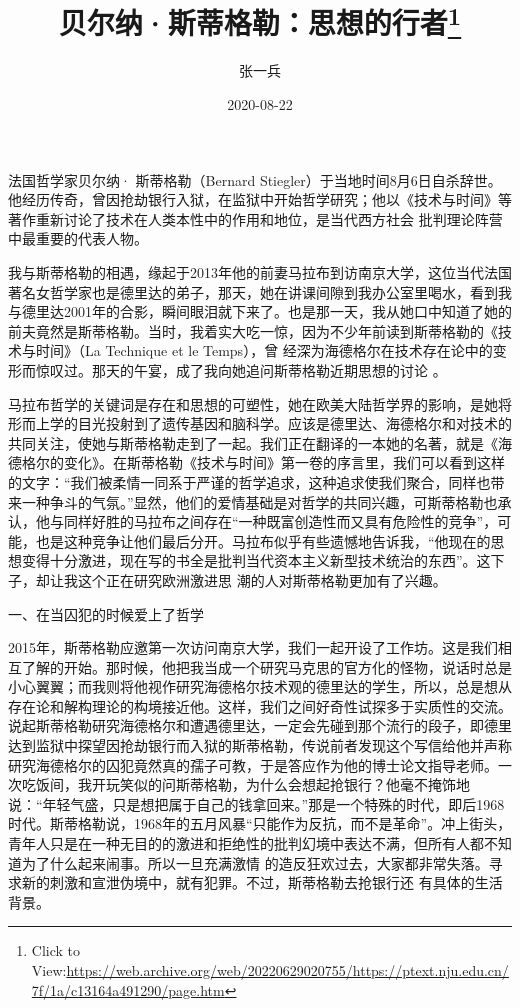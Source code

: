 \documentclass{article}
\title{贝尔纳·斯蒂格勒：思想的行者\footnote{Click to View:\url{https://web.archive.org/web/20220629020755/https://ptext.nju.edu.cn/7f/1a/c13164a491290/page.htm}}}
\author{张一兵}
\date{2020-08-22}
\begin{document}

\maketitle


\Large

﻿法国哲学家贝尔纳· 斯蒂格勒（Bernard Stiegler）于当地时间8月6日自杀辞世。他经历传奇，曾因抢劫银行入狱，在监狱中开始哲学研究；他以《技术与时间》等著作重新讨论了技术在人类本性中的作用和地位，是当代西方社会
批判理论阵营中最重要的代表人物。 

我与斯蒂格勒的相遇，缘起于2013年他的前妻马拉布到访南京大学，这位当代法国著名女哲学家也是德里达的弟子，那天，她在讲课间隙到我办公室里喝水，看到我与德里达2001年的合影，瞬间眼泪就下来了。也是那一天，我从她口中知道了她的前夫竟然是斯蒂格勒。当时，我着实大吃一惊，因为不少年前读到斯蒂格勒的《技术与时间》（La Technique et le Temps），曾
\newpage
经深为海德格尔在技术存在论中的变形而惊叹过。那天的午宴，成了我向她追问斯蒂格勒近期思想的讨论
。 

马拉布哲学的关键词是存在和思想的可塑性，她在欧美大陆哲学界的影响，是她将形而上学的目光投射到了遗传基因和脑科学。应该是德里达、海德格尔和对技术的共同关注，使她与斯蒂格勒走到了一起。我们正在翻译的一本她的名著，就是《海德格尔的变化》。在斯蒂格勒《技术与时间》第一卷的序言里，我们可以看到这样的文字：“我们被柔情一同系于严谨的哲学追求，这种追求使我们聚合，同样也带来一种争斗的气氛。”显然，他们的爱情基础是对哲学的共同兴趣，可斯蒂格勒也承认，他与同样好胜的马拉布之间存在“一种既富创造性而又具有危险性的竞争”，可能，也是这种竞争让他们最后分开。马拉布似乎有些遗憾地告诉我，“他现在的思想变得十分激进，现在写的书全是批判当代资本主义新型技术统治的东西”。这下子，却让我这个正在研究欧洲激进思
潮的人对斯蒂格勒更加有了兴趣。 

\newpage


一、在当囚犯的时候爱上了哲学 

2015年，斯蒂格勒应邀第一次访问南京大学，我们一起开设了工作坊。这是我们相互了解的开始。那时候，他把我当成一个研究马克思的官方化的怪物，说话时总是小心翼翼；而我则将他视作研究海德格尔技术观的德里达的学生，所以，总是想从存在论和解构理论的构境接近他。这样，我们之间好奇性试探多于实质性的交流。
说起斯蒂格勒研究海德格尔和遭遇德里达，一定会先碰到那个流行的段子，即德里达到监狱中探望因抢劫银行而入狱的斯蒂格勒，传说前者发现这个写信给他并声称研究海德格尔的囚犯竟然真的孺子可教，于是答应作为他的博士论文指导老师。一次吃饭间，我开玩笑似的问斯蒂格勒，为什么会想起抢银行？他毫不掩饰地说：“年轻气盛，只是想把属于自己的钱拿回来。”那是一个特殊的时代，即后1968时代。斯蒂格勒说，1968年的五月风暴“只能作为反抗，而不是革命”。冲上街头，青年人只是在一种无目的的激进和拒绝性的批判幻境中表达不满，但所有人都不知道为了什么起来闹事。所以一旦充满激情
\newpage
的造反狂欢过去，大家都非常失落。寻求新的刺激和宣泄伪境中，就有犯罪。不过，斯蒂格勒去抢银行还
有具体的生活背景。 
\end{document}
